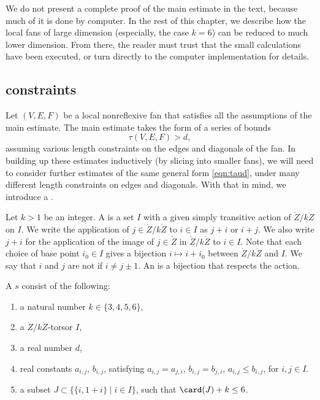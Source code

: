 We do not present a complete proof of the main estimate in the text,
because much of it is done by computer.  In the rest of this chapter,
we describe how the local fans of large dimension (especially, the case $k=6$)
can be reduced to much lower dimension.  From there, the reader must
trust that the small calculations have been executed, or turn directly to
the computer implementation for details.

\subsection{constraints}

Let $(V,E,F)$ be a local nonreflexive fan that satisfies all the assumptions
of the main estimate.  The main estimate takes the form of a series of
bounds
\begin{equation}\label{eqn:taud}
\tau(V,E,F) > d,
\end{equation}
assuming various length constraints on the edges and diagonals of the fan.
In building up these estimates inductively (by slicing into
smaller fans), we will need to consider further estimates of the same
general form \eqref{eqn:taud}, under many different length constraints on
edges and diagonals.
With that in mind, we introduce a .

\begin{definition}
  Let $k>1$ be an integer.  A  is a set $I$ with a
  given simply transitive action of $\ring{Z}/k\ring{Z}$ on $I$.  We
  write the application of $j\in\ring{Z}/k\ring{Z}$ to $i\in I$ as
  $j+i$ or $i+j$.  We also write $j+i$
  for the application of the image of $j\in\ring{Z}$ in $\ring{Z}/k\ring{Z}$ to
  $i\in I$.  Note that each choice of base point $i_0\in I$ gives a
  bijection $i\mapsto i+i_0$ between $\ring{Z}/k\ring{Z}$ and $I$.  
  We say that $i$ and $j$ are not  if $i\ne j\pm 1$.
  An
   is a bijection that respects the action.
%
\end{definition}

\begin{definition}
A  $s$ consist of the following:
\begin{enumerate}
\item a natural number $k\in \{3,4,5,6\}$,
\item a $\ring{Z}/k\ring{Z}$-torsor $I$,
\item a real number $d$,
\item real constants $a_{i,j}$, $b_{i,j}$,  satisfying
   $a_{i,j} = a_{j,i}$, $b_{i,j}=b_{j,i}$, $a_{i,j}\le b_{i,j}$, for $i,j\in I$.
\item a subset $J\subset \{ \{i,1+i\} \mid i\in I\}$, such that $\card(J)+k\le 6$.
\end{enumerate}
\end{definition}

